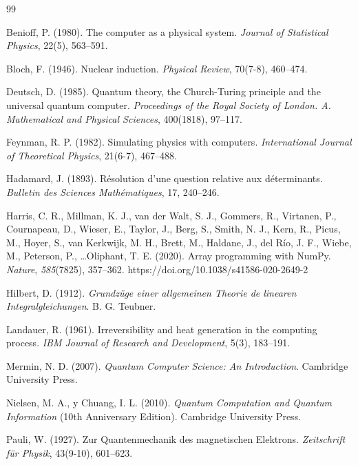 \documentclass[11pt,a4paper,spanish]{book}
\begin{document}
\begin{thebibliography}{99}

Benioff, P. (1980). The computer as a physical system. \emph{Journal of Statistical Physics}, 22(5), 563--591.

Bloch, F. (1946). Nuclear induction. \emph{Physical Review}, 70(7-8), 460--474.

Deutsch, D. (1985). Quantum theory, the Church-Turing principle and the universal quantum computer. \emph{Proceedings of the Royal Society of London. A. Mathematical and Physical Sciences}, 400(1818), 97--117.

Feynman, R. P. (1982). Simulating physics with computers. \emph{International Journal of Theoretical Physics}, 21(6-7), 467--488.

Hadamard, J. (1893). Résolution d'une question relative aux déterminants. \emph{Bulletin des Sciences Mathématiques}, 17, 240--246.

Harris, C. R., Millman, K. J., van der Walt, S. J., Gommers, R., Virtanen, P., Cournapeau, D., Wieser, E., Taylor, J., Berg, S., Smith, N. J., Kern, R., Picus, M., Hoyer, S., van Kerkwijk, M. H., Brett, M., Haldane, J., del Río, J. F., Wiebe, M., Peterson, P., \dots Oliphant, T. E. (2020). Array programming with NumPy. \emph{Nature}, \emph{585}(7825), 357--362. https://doi.org/10.1038/s41586-020-2649-2

Hilbert, D. (1912). \emph{Grundzüge einer allgemeinen Theorie de linearen Integralgleichungen}. B. G. Teubner.

Landauer, R. (1961). Irreversibility and heat generation in the computing process. \emph{IBM Journal of Research and Development}, 5(3), 183--191.

Mermin, N. D. (2007). \emph{Quantum Computer Science: An Introduction}. Cambridge University Press.

Nielsen, M. A., y Chuang, I. L. (2010). \emph{Quantum Computation and Quantum Information} (10th Anniversary Edition). Cambridge University Press.

Pauli, W. (1927). Zur Quantenmechanik des magnetischen Elektrons. \emph{Zeitschrift für Physik}, 43(9-10), 601--623.


\end{thebibliography}
\end{document}
